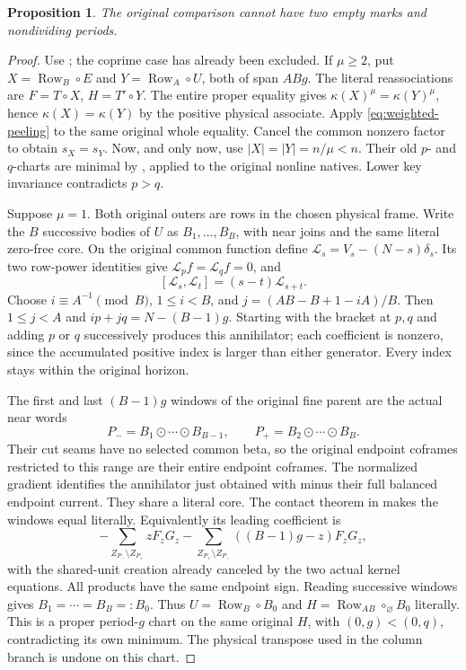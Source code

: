 \documentclass[11pt,a4paper]{amsart}
\numberwithin{equation}{section}
\theoremstyle{plain}
\newtheorem{proposition}[theorem]{Proposition}
\theoremstyle{definition}
\newcommand{\Row}{\operatorname{Row}}
\begin{document}
\begin{proposition}\label{prop:empty-exit}
The original comparison cannot have two empty marks and nondividing
periods.
\end{proposition}
\begin{proof}
Use ; the coprime case has already been excluded.
If \(\mu\ge2\), put
\(X=\Row_B\circ E\) and \(Y=\Row_A\circ U\), both of span \(ABg\).
The literal reassociations are \(F=T\circ X\), \(H=T'\circ Y\).
The entire proper equality gives \(\kappa(X)^\mu=\kappa(Y)^\mu\), hence
\(\kappa(X)=\kappa(Y)\) by the positive physical associate.
Apply \eqref{eq:weighted-peeling} to the same original whole equality.
Cancel the common nonzero factor to obtain \(s_X=s_Y\).
Now, and only now, use \(|X|=|Y|=n/\mu<n\).  Their old \(p\)- and \(q\)-charts
are minimal by , applied to the original nonline natives.
Lower key invariance contradicts \(p>q\).

Suppose \(\mu=1\).  Both original outers are rows in the chosen physical
frame.  Write the \(B\) successive bodies of \(U\) as \(B_1,\ldots,B_B\), with
near joins and the same literal zero-free core.  On the original common
function define
\(\mathcal L_s=V_s-(N-s)\delta_s\).  Its two row-power identities give
\(\mathcal L_p f=\mathcal L_q f=0\), and
\[
 [\mathcal L_s,\mathcal L_t]=(s-t)\mathcal L_{s+t}.
\]
Choose \(i\equiv A^{-1}\pmod B\), \(1\le i<B\), and
\(j=(AB-B+1-iA)/B\).  Then \(1\le j<A\) and
\(ip+jq=N-(B-1)g\).  Starting with the bracket at \(p,q\) and adding \(p\) or
\(q\) successively produces this annihilator; each coefficient is nonzero,
since the accumulated positive index is larger than either generator.
Every index stays within the original horizon.

The first and last \((B-1)g\) windows of the original fine parent are the
actual near words
\[
 P_-=B_1\odot\cdots\odot B_{B-1},\qquad
 P_+=B_2\odot\cdots\odot B_B.
\]
Their cut seams have no selected common beta, so the original endpoint
coframes restricted to this range are their entire endpoint coframes.
The normalized gradient identifies the annihilator just obtained with
minus their full balanced endpoint current.  They share a literal core.
The contact theorem in  makes the windows equal
literally.  Equivalently its leading coefficient is
\[
 -\sum_{Z_{P_-}\setminus Z_{P_+}}zF_zG_z
 -\sum_{Z_{P_+}\setminus Z_{P_-}}((B-1)g-z)F_zG_z,
\]
with the shared-unit creation already canceled by the two actual kernel
equations.  All products have the same endpoint sign.
Reading successive windows gives \(B_1=\cdots=B_B=:B_0\).
Thus \(U=\Row_B\circ B_0\) and
\(H=\Row_{AB}\circ_\varnothing B_0\) literally.
This is a proper period-\(g\) chart on the same original \(H\), with
\((0,g)<(0,q)\), contradicting its own minimum.  The physical transpose
used in the column branch is undone on this chart.
\end{proof}
\end{document}
